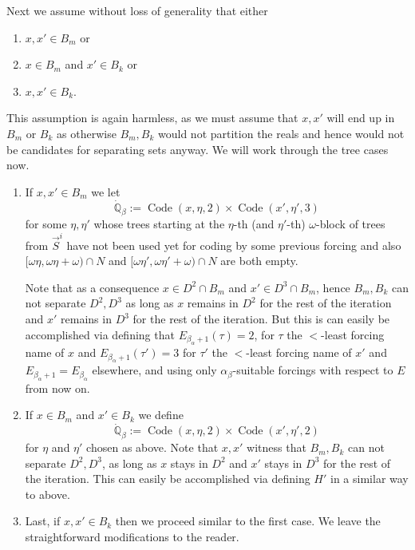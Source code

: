 \documentclass[a4paper,11pt]{article}
\newcommand{\forceQ}{\mathbb{Q}}
\begin{document}
{Next we assume without loss of generality that either 
\begin{enumerate}
\item $x,x' \in B_m$ or 
\item $x \in B_m$ and $x' \in B_k$ or 
\item $x,x' \in B_k$.
\end{enumerate}
This assumption is again harmless, as we must assume that $x,x'$ will end up in $B_m$ or $B_k$ as otherwise $B_m,B_k$ would not partition the reals and hence would not be candidates for separating sets anyway. We will work through the tree cases now.
\begin{enumerate}
\item If $x,x' \in B_m$ we let
\[ \dot{\forceQ}_{\beta} := \operatorname{Code} (x,\eta,2) \times \operatorname{Code} (x',\eta' ,3) \]
for some $\eta, \eta'$ whose trees starting at the $\eta$-th  (and $\eta'$-th)  $\omega$-block of trees from $\vec{S}^i$ have not been used yet for coding by some previous forcing and also  $[\omega \eta, \omega \eta +\omega) \cap N$ and $[\omega \eta', \omega \eta' + \omega) \cap N$ are both empty.

Note that as a consequence $x \in D^2 \cap B_m$ and $x' \in D^3 \cap B_m$, hence $B_m, B_k$ can not separate $D^2,D^3$ as long as $x$ remains in $D^2$ for the rest of the iteration and $x'$ remains in $D^3$ for the rest of the iteration. But this is can easily be accomplished via defining that $E_{\beta_{\alpha}+1} (\tau) = 2$, for $\tau$ the $<$-least forcing name of $x$ and $E_{\beta_{\alpha}+1} (\tau')=3$ for $\tau'$ the $<$-least forcing name of $x'$ and $E_{\beta_{\alpha}+1} =E_{\beta_{\alpha}}$ elsewhere, and using only $\alpha_{\beta}$-suitable forcings with respect to $E$ from now on.

\item If $x \in B_m$ and $x' \in B_k$ we define
\[ \dot{\forceQ}_{\beta} := \operatorname{Code} (x,\eta ,2) \times \operatorname{Code} (x' ,\eta',2) \]
for $\eta$ and $\eta'$ chosen as above. Note that $x,x'$ witness that $B_m,B_k$ can not separate $D^2,D^3$, as long as $x$ stays in $D^2$ and $x'$ stays in $D^3$ for the rest of the iteration. This can easily be accomplished via defining $H'$ in a similar way to above.

\item Last, if $x,x' \in B_k$ then we proceed similar to the first case. We leave the straightforward modifications to the reader.

\end{enumerate}

}
\end{document}
